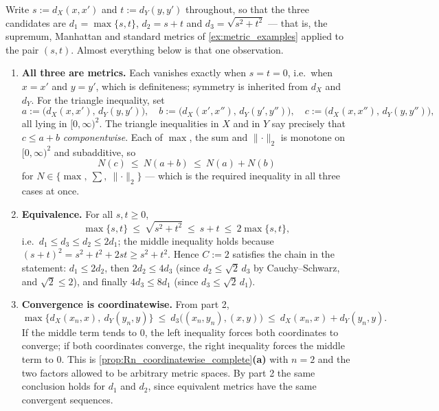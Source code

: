 \begin{exercisesolution}
Write $s := d_X(x,x')$ and $t := d_Y(y,y')$ throughout, so that the three candidates are
$d_1 = \max\{s,t\}$, $d_2 = s+t$ and $d_3 = \sqrt{s^2+t^2}$ --- that is, the supremum, Manhattan
and standard metrics of \cref{ex:metric_examples} applied to the pair $(s,t)$. Almost everything
below is that one observation.
\begin{enumerate}[label=\textbf{\arabic*.}]
  \item \textbf{All three are metrics.} Each vanishes exactly when $s = t = 0$, i.e.\ when
    $x=x'$ and $y=y'$, which is definiteness; symmetry is inherited from $d_X$ and $d_Y$. For
    the triangle inequality, set
    \[a := \big(d_X(x,x'),\,d_Y(y,y')\big), \quad
      b := \big(d_X(x',x''),\,d_Y(y',y'')\big), \quad
      c := \big(d_X(x,x''),\,d_Y(y,y'')\big),\]
    all lying in $[0,\infty)^2$. The triangle inequalities in $X$ and in $Y$ say precisely that
    $c \leq a+b$ \emph{componentwise}. Each of $\max$, the sum and $\lVert\cdot\rVert_2$ is
    monotone on $[0,\infty)^2$ and subadditive, so
    \[N(c) \ \leq\ N(a+b) \ \leq\ N(a) + N(b)\]
    for $N \in \{\max,\ \textstyle\sum,\ \lVert\cdot\rVert_2\}$ --- which is the required
    inequality in all three cases at once.
  \item \textbf{Equivalence.} For all $s,t \geq 0$,
    \[\max\{s,t\} \ \leq\ \sqrt{s^2+t^2} \ \leq\ s+t \ \leq\ 2\max\{s,t\},\]
    i.e.\ $d_1 \leq d_3 \leq d_2 \leq 2d_1$; the middle inequality holds because
    $(s+t)^2 = s^2+t^2+2st \geq s^2+t^2$. Hence $C := 2$ satisfies the chain in the statement:
    $d_1 \leq 2d_2$, then $2d_2 \leq 4d_3$ (since $d_2 \leq \sqrt2\,d_3$ by Cauchy--Schwarz,
    and $\sqrt2 \leq 2$), and finally $4d_3 \leq 8d_1$ (since $d_3 \leq \sqrt2\,d_1$).
  \item \textbf{Convergence is coordinatewise.} From part 2,
    \[\max\big\{d_X(x_n,x),\ d_Y(y_n,y)\big\}
      \ \leq\ d_3\big((x_n,y_n),(x,y)\big)
      \ \leq\ d_X(x_n,x) + d_Y(y_n,y).\]
    If the middle term tends to $0$, the left inequality forces both coordinates to converge; if
    both coordinates converge, the right inequality forces the middle term to $0$. This is
    \cref{prop:Rn_coordinatewise_complete}\textbf{(a)} with $n = 2$ and the two factors allowed
    to be arbitrary metric spaces. By part 2 the same conclusion holds for $d_1$ and $d_2$,
    since equivalent metrics have the same convergent sequences.
\end{enumerate}
\end{exercisesolution}

